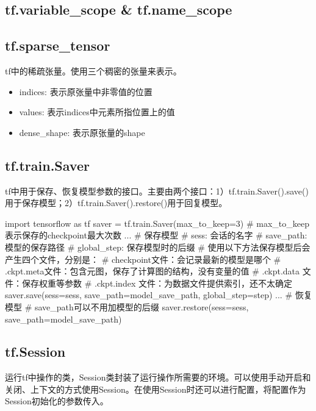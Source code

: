 \subsection{tf.variable\_scope \& tf.name\_scope}

\subsection{tf.sparse\_tensor}	tf中的稀疏张量。使用三个稠密的张量来表示。
\begin{itemize}
	\item indices: 表示原张量中非零值的位置
	\item values: 表示indices中元素所指位置上的值
	\item dense\_shape: 表示原张量的shape
\end{itemize}

\subsection{tf.train.Saver}tf中用于保存、恢复模型参数的接口。主要由两个接口：1）tf.train.Saver().save()用于保存模型；2）tf.train.Saver().restore()用于回复模型。
\begin{python}
	import tensorflow as tf
	saver = tf.train.Saver(max\_to\_keep=3) # max\_to\_keep表示保存的checkpoint最大次数
	...
	# 保存模型
	# sess: 会话的名字
	# save\_path: 模型的保存路径
	# global\_step: 保存模型时的后缀
	# 使用以下方法保存模型后会产生四个文件，分别是：
	# checkpoint文件：会记录最新的模型是哪个
	# .ckpt.meta文件：包含元图，保存了计算图的结构，没有变量的值
	# .ckpt.data 文件：保存权重等参数
	# .ckpt.index 文件：为数据文件提供索引，{还不太确定}
	saver.save(sess=sess, save_path=model_save_path, global_step=step)
	...
	# 恢复模型
	# save_path可以不用加模型的后缀
	saver.restore(sess=sess, save_path=model_save_path)
\end{python}

\subsection{tf.Session}运行tf中操作的类，Session类封装了运行操作所需要的环境。可以使用手动开启和关闭、上下文的方式使用Session。在使用Session时还可以进行配置，将配置作为Session初始化的参数传入。

